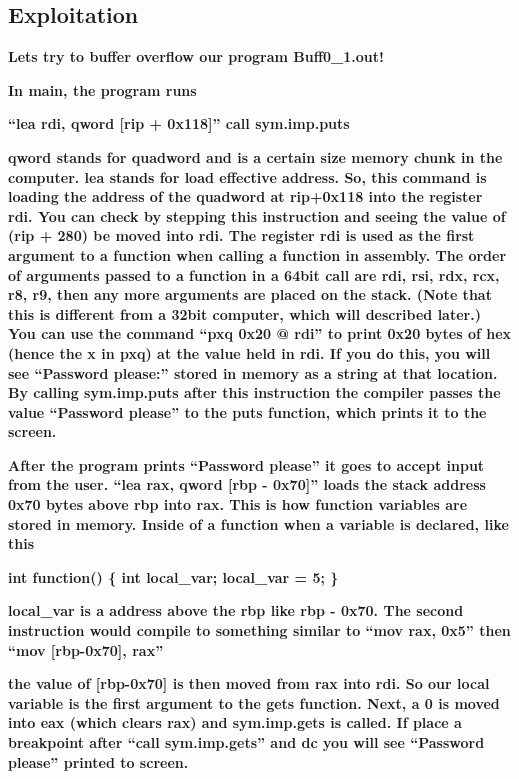\subsection{Exploitation}

\textbf{Lets try to buffer overflow our program Buff0\_1.out!}

\textbf{In main, the program runs}

\textbf{{}``lea rdi, qword [rip + 0x118]''\newline
call sym.imp.puts}

\textbf{qword stands for quadword and is a certain size memory chunk in the computer. lea stands for load effective
address. So, this command is loading the address of the quadword at rip+0x118 into the register rdi. You can check by
stepping this instruction and seeing the value of (rip + 280) be moved into rdi. The register rdi is used as the first
argument to a function when calling a function in assembly. The order of arguments passed to a function in a 64bit call
are rdi, rsi, rdx, rcx, r8, r9, then any more arguments are placed on the stack. (Note that this is different from a
32bit computer, which will described later.) You can use the command ``pxq 0x20 @ rdi'' to print 0x20 bytes of hex
(hence the x in pxq) at the value held in rdi. If you do this, you will see ``Password please:'' stored in memory as a
string at that location. By calling sym.imp.puts after this instruction the compiler passes the value ``Password
please'' to the puts function, which prints it to the screen.}

  
 

\textbf{After the program prints ``Password please'' it goes to accept input from the user. ``lea rax, qword [rbp -
0x70]'' loads the stack address 0x70 bytes above rbp into rax. This is how function variables are stored in memory.
Inside of a function when a variable is declared, like this}

\textbf{int function() \{ int local\_var; local\_var = 5; \}}

\textbf{local\_var is a address above the rbp like rbp - 0x70. The second instruction would compile to something similar
to ``mov rax, 0x5'' then ``mov [rbp-0x70], rax''}

\textbf{the value of [rbp-0x70] is then moved from rax into rdi. So our local variable is the first argument to the gets
function. Next, a 0 is moved into eax (which clears rax) and sym.imp.gets is called. If place a breakpoint after ``call
sym.imp.gets'' and dc you will see ``Password please'' printed to screen.}

